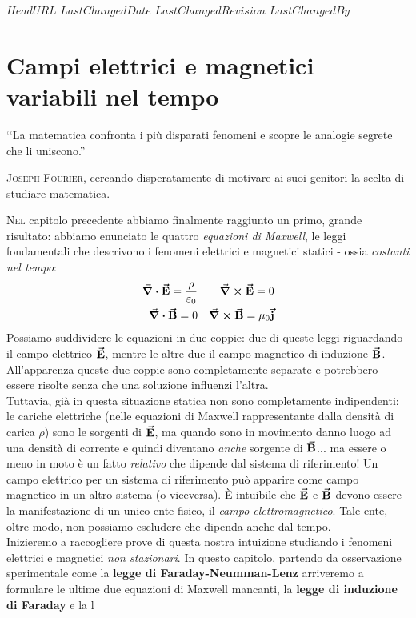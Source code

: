 \svnidlong
{$HeadURL$}
{$LastChangedDate$}
{$LastChangedRevision$}
{$LastChangedBy$}
\chapter{Campi elettrici e magnetici variabili nel tempo}

\begin{introduction}
	‘‘La matematica confronta i più disparati fenomeni e scopre le analogie segrete che li uniscono.''
	\begin{flushright}
		\textsc{Joseph Fourier,} cercando disperatamente di motivare ai suoi genitori la scelta di studiare matematica. %
	\end{flushright}
\end{introduction} %
\lettrine[findent=1pt, nindent=0pt]{N}{el} capitolo precedente abbiamo finalmente raggiunto un primo, grande risultato: abbiamo enunciato le quattro \textit{equazioni di Maxwell}, le leggi fondamentali che descrivono i fenomeni elettrici e magnetici statici - ossia \textit{costanti nel tempo}:
\begin{align*}
	\div{\vb*{\va{E}}}=\frac{\rho}{\varepsilon_0}&&\curl{\vb*{\va{E}}}=0\\
	\div{\vb*{\va{B}}}=0&&\curl{\vb*{\va{B}}}=\mu_0\vb*{\va{j}}
\end{align*}
Possiamo suddividere le equazioni in due coppie: due di queste leggi riguardando il campo elettrico $\vb*{\va{E}}$, mentre le altre due il campo magnetico di induzione $\vb*{\va{B}}$. All'apparenza queste due coppie sono completamente separate e potrebbero essere risolte senza che una soluzione influenzi l'altra.\\
Tuttavia, già in questa situazione statica non sono completamente indipendenti: le cariche elettriche (nelle equazioni di Maxwell rappresentante dalla densità di carica $\rho$) sono le sorgenti di $\vb*{\va{E}}$, ma quando sono in movimento danno luogo ad una densità di corrente e quindi diventano \textit{anche} sorgente di $\vb*{\va{B}}$... ma essere o meno in moto è un fatto \textit{relativo} che dipende dal sistema di riferimento! Un campo elettrico per un sistema di riferimento può apparire come campo magnetico in un altro sistema (o viceversa). È intuibile che $\vb*{\va{E}}$ e $\vb*{\va{B}}$ devono essere la manifestazione di un unico ente fisico, il \textit{campo elettromagnetico}. Tale ente, oltre modo, non possiamo escludere che dipenda anche dal tempo.\\
Inizieremo a raccogliere prove di questa nostra intuizione studiando i fenomeni elettrici e magnetici \textit{non stazionari}. In questo capitolo, partendo da osservazione sperimentale come la \textbf{legge di Faraday-Neumman-Lenz} arriveremo a formulare le ultime due equazioni di Maxwell mancanti, la \textbf{legge di induzione di Faraday} e la l
